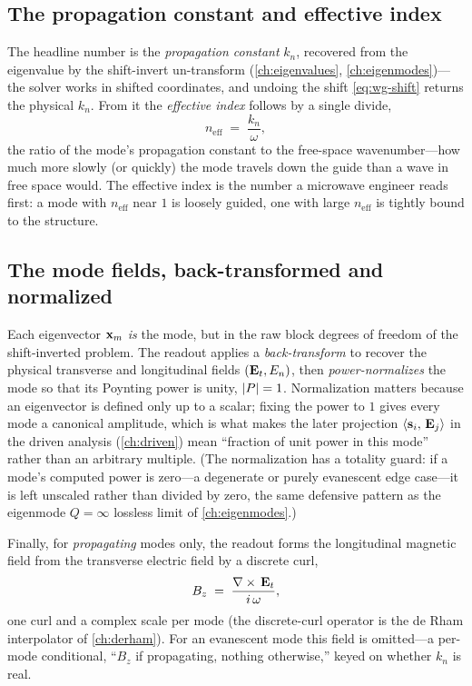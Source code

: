 \subsection{The propagation constant and effective index}

The headline number is the \emph{propagation constant} $k_n$, recovered from the
eigenvalue by the shift-invert un-transform (\cref{ch:eigenvalues},
\cref{ch:eigenmodes})---the solver works in shifted coordinates, and undoing the
shift \eqref{eq:wg-shift} returns the physical $k_n$. From it the
\emph{effective index} follows by a single divide,
\begin{equation}
  n_\text{eff} \;=\; \frac{k_n}{\omega},
  \label{eq:neff}
\end{equation}
the ratio of the mode's propagation constant to the free-space wavenumber---how
much more slowly (or quickly) the mode travels down the guide than a wave in free
space would. The effective index is the number a microwave engineer reads first: a
mode with $n_\text{eff}$ near $1$ is loosely guided, one with large
$n_\text{eff}$ is tightly bound to the structure.

\subsection{The mode fields, back-transformed and normalized}

Each eigenvector $\mathbf{x}_m$ \emph{is} the mode, but in the raw block degrees of
freedom of the shift-inverted problem. The readout applies a \emph{back-transform}
to recover the physical transverse and longitudinal fields $(\mathbf{E}_t, E_n)$, then
\emph{power-normalizes} the mode so that its Poynting power is unity, $\lvert P\rvert=1$.
Normalization matters because an eigenvector is defined only up to a scalar; fixing
the power to $1$ gives every mode a canonical amplitude, which is what makes the
later projection $\left\langle \mathbf{s}_i,\, \mathbf{E}_j\right\rangle$ in the driven analysis (\cref{ch:driven})
mean ``fraction of unit power in this mode'' rather than an arbitrary multiple.
(The normalization has a totality guard: if a mode's computed power is zero---a
degenerate or purely evanescent edge case---it is left unscaled rather than divided
by zero, the same defensive pattern as the eigenmode $Q=\infty$ lossless limit of
\cref{ch:eigenmodes}.)

Finally, for \emph{propagating} modes only, the readout forms the longitudinal
magnetic field from the transverse electric field by a discrete curl,
\begin{equation}
  B_z \;=\; \frac{\nabla\times\,\mathbf{E}_t}{i\,\omega},
  \label{eq:bz}
\end{equation}
one curl and a complex scale per mode (the discrete-curl operator is the de Rham
interpolator of \cref{ch:derham}). For an evanescent mode this field is omitted---a
per-mode conditional, ``$B_z$ if propagating, nothing otherwise,'' keyed on whether
$k_n$ is real.

